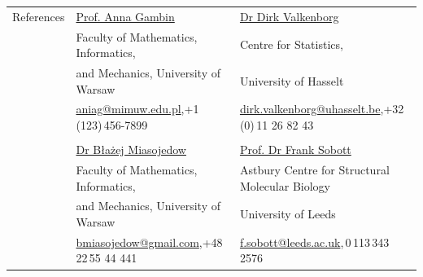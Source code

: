 \documentclass[letterpaper,11pt,oneside]{article}
\begin{document}
\vspace{12ex}

\noindent \begin{tabular}{@{} l l l}
 \Large{References} & \href{https://www.mimuw.edu.pl/~aniag/}{Prof. Anna Gambin} & \href{https://www.elixir-belgium.org/organisation/collaborators/dirkvalkenborg}{Dr Dirk Valkenborg} \\
 & Faculty of Mathematics, Informatics,&  Centre for Statistics,\\
 & and  Mechanics, University of Warsaw &  University of Hasselt \\
 & \small{\href{mailto:aniag@mimuw.edu.pl}{aniag@mimuw.edu.pl},+1\,(123)\,456-7899} & \small{\href{dirk.valkenborg@uhasselt.be}{dirk.valkenborg@uhasselt.be},+32\,(0)\,11 26 82 43} \\
&& \\
 & \href{https://scholar.google.pl/citations?user=_PedoD8AAAAJ&hl=en}{Dr Błażej Miasojedow} & \href{https://www.uantwerpen.be/en/rg/bams/people/prof--dr--frank-sobo/}{Prof. Dr Frank Sobott}  \\
 & Faculty of Mathematics, Informatics, &  Astbury Centre for Structural Molecular Biology\\
 & and  Mechanics, University of Warsaw &  University of Leeds \\
 & \small{\href{bmiasojedow@gmail.com}{bmiasojedow@gmail.com},+48\,22\,55 44 441} & \small{\href{mailto:f.sobott@leeds.ac.uk}{f.sobott@leeds.ac.uk},\,0\,113\,343\,2576} \\
\end{tabular}






\end{document}
